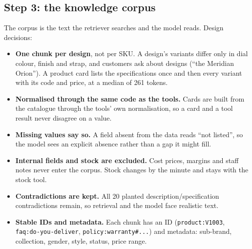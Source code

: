 \documentclass[11pt,a4paper]{article}
\begin{document}
\subsection{Step 3: the knowledge corpus}\label{sec:corpus}
The corpus is the text the retriever searches and the model reads. Design decisions:
\begin{itemize}
  \item \textbf{One chunk per design}, not per SKU. A design's variants differ only in dial colour, finish and strap, and
        customers ask about designs (``the Meridian Orion''). A product card lists the specifications once and then
        every variant with its code and price, at a median of 261 tokens.
  \item \textbf{Normalised through the same code as the tools.} Cards are built from the catalogue through the tools'
        own normalisation, so a card and a tool result never disagree on a value.
  \item \textbf{Missing values say so.} A field absent from the data reads ``not listed'', so the model sees an explicit
        absence rather than a gap it might fill.
  \item \textbf{Internal fields and stock are excluded.} Cost prices, margins and staff notes never enter the corpus.
        Stock changes by the minute and stays with the stock tool.
  \item \textbf{Contradictions are kept.} All 20 planted description/specification contradictions remain, so retrieval
        and the model face realistic text.
  \item \textbf{Stable IDs and metadata.} Each chunk has an ID (\texttt{product:V1003}, \texttt{faq:do-you-deliver},
        \texttt{policy:warranty\#...}) and metadata: sub-brand, collection, gender, style, status, price range.
\end{itemize}

\begin{table}[H]
\centering
\small
{}
\caption{The knowledge corpus. Eight automated checks confirm IDs, coverage and the absence of internal data.}
\label{tab:corpus}
\end{table}
\end{document}
